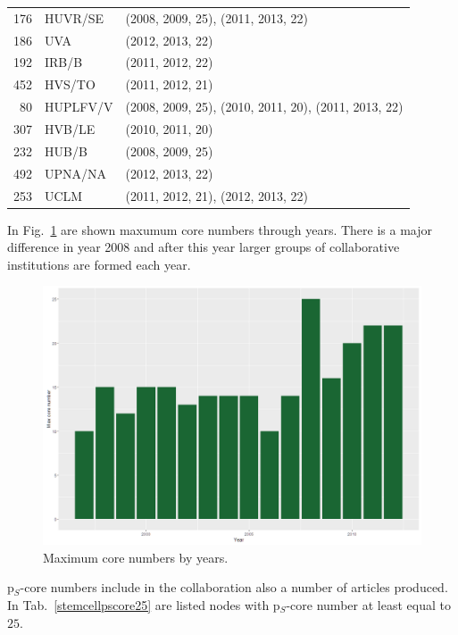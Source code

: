 \documentclass[a4paper,twoside,10pt]{article}
\begin{document}
\begin{center}
\begin{longtable}{rll}
176 & HUVR/SE     & (2008, 2009, 25), (2011, 2013, 22) \\
186 & UVA         & (2012, 2013, 22) \\
192 & IRB/B       & (2011, 2012, 22) \\
452 & HVS/TO      & (2011, 2012, 21) \\
 80 & HUPLFV/V    & (2008, 2009, 25), (2010, 2011, 20), (2011, 2013, 22) \\
307 & HVB/LE      & (2010, 2011, 20) \\
232 & HUB/B       & (2008, 2009, 25) \\
492 & UPNA/NA     & (2012, 2013, 22) \\
253 & UCLM        & (2011, 2012, 21), (2012, 2013, 22)
\end{longtable}
\end{center}

In Fig.~\ref{stemcell} are shown maxumum core numbers through years. There is a major difference in year 2008 and after this year larger groups of collaborative institutions are formed each year.

\begin{figure}[!h]
	\centering
	\includegraphics[width=\textwidth]{./pics/StemCellMaxCore.png}
  \caption{Maximum core numbers by years.}
  \label{stemcell}
\end{figure}

p$_S$-core numbers include in the collaboration also a number of articles produced. In Tab.~\ref{stemcellpscore25} are listed nodes with p$_S$-core number at least equal to $25$.
\end{document}
